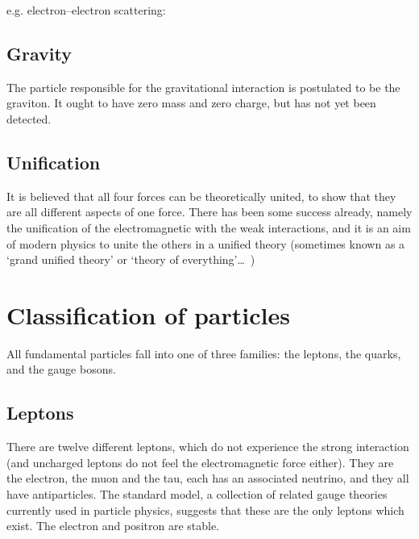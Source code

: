 \documentclass[a4paper,12pt]{article}
\begin{document}
e.g. electron--electron scattering:


\subsection{Gravity}
The particle responsible for the gravitational interaction is postulated to be the graviton.  It ought to have zero mass and zero charge, but has not yet been detected.

\subsection{Unification}
It is believed that all four forces can be theoretically united, to show that they are all different aspects of one force.  There has been some success already, namely the unification of the electromagnetic with the weak interactions, and it is an aim of modern physics to unite the others in a unified theory (sometimes known as a `grand unified theory' or `theory of everything'\ldots\ )


\section{Classification of particles}
All fundamental particles fall into one of three families: the leptons, the quarks, and the gauge bosons.

\subsection{Leptons}

There are twelve different leptons, which do not experience the strong interaction (and uncharged leptons do not feel the electromagnetic force either).  They are the electron, the muon and the tau, each has an associated neutrino, and they all have antiparticles.  The standard model, a collection of related gauge theories currently used in particle physics, suggests that these are the only leptons which exist.  The electron and positron are stable.
\end{document}
